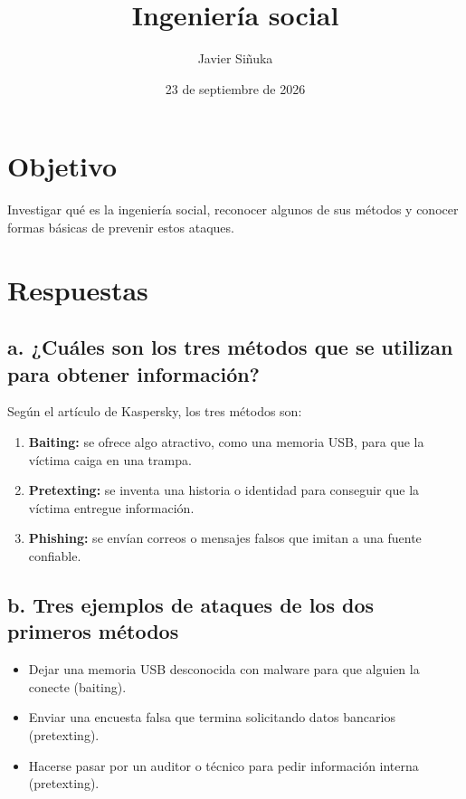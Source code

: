 \documentclass[11pt,a4paper]{article}
\title{Ingeniería social}
\author{Javier Siñuka}
\date{23 de septiembre de 2026}
\begin{document}
\maketitle

\section{Objetivo}

Investigar qué es la ingeniería social, reconocer algunos de sus métodos y
conocer formas básicas de prevenir estos ataques.

\section{Respuestas}

\subsection*{a. ¿Cuáles son los tres métodos que se utilizan para obtener información?}

Según el artículo de Kaspersky, los tres métodos son:

\begin{enumerate}[noitemsep]
    \item \textbf{Baiting:} se ofrece algo atractivo, como una memoria USB, para que la víctima caiga en una trampa.
    \item \textbf{Pretexting:} se inventa una historia o identidad para conseguir que la víctima entregue información.
    \item \textbf{Phishing:} se envían correos o mensajes falsos que imitan a una fuente confiable.
\end{enumerate}

\subsection*{b. Tres ejemplos de ataques de los dos primeros métodos}

\begin{itemize}[noitemsep]
    \item Dejar una memoria USB desconocida con malware para que alguien la conecte (baiting).
    \item Enviar una encuesta falsa que termina solicitando datos bancarios (pretexting).
    \item Hacerse pasar por un auditor o técnico para pedir información interna (pretexting).
\end{itemize}
\end{document}
